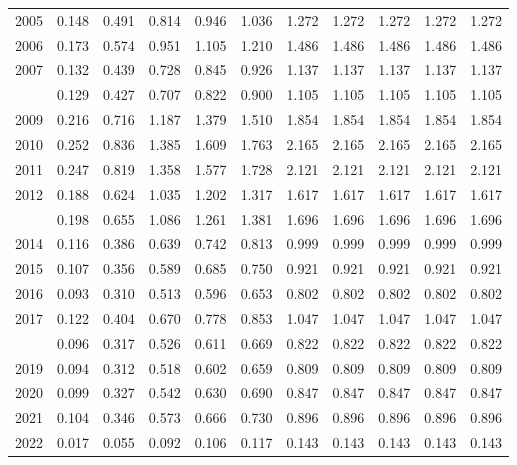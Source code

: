 \documentclass[
]{article}
\begin{document}
\begin{longtable}[t]{lrrrrrrrrrr}
2005 & 0.148 & 0.491 & 0.814 & 0.946 & 1.036 & 1.272 & 1.272 & 1.272 & 1.272 & 1.272\\
2006 & 0.173 & 0.574 & 0.951 & 1.105 & 1.210 & 1.486 & 1.486 & 1.486 & 1.486 & 1.486\\
2007 & 0.132 & 0.439 & 0.728 & 0.845 & 0.926 & 1.137 & 1.137 & 1.137 & 1.137 & 1.137\\
\addlinespace
2008 & 0.129 & 0.427 & 0.707 & 0.822 & 0.900 & 1.105 & 1.105 & 1.105 & 1.105 & 1.105\\
2009 & 0.216 & 0.716 & 1.187 & 1.379 & 1.510 & 1.854 & 1.854 & 1.854 & 1.854 & 1.854\\
2010 & 0.252 & 0.836 & 1.385 & 1.609 & 1.763 & 2.165 & 2.165 & 2.165 & 2.165 & 2.165\\
2011 & 0.247 & 0.819 & 1.358 & 1.577 & 1.728 & 2.121 & 2.121 & 2.121 & 2.121 & 2.121\\
2012 & 0.188 & 0.624 & 1.035 & 1.202 & 1.317 & 1.617 & 1.617 & 1.617 & 1.617 & 1.617\\
\addlinespace
2013 & 0.198 & 0.655 & 1.086 & 1.261 & 1.381 & 1.696 & 1.696 & 1.696 & 1.696 & 1.696\\
2014 & 0.116 & 0.386 & 0.639 & 0.742 & 0.813 & 0.999 & 0.999 & 0.999 & 0.999 & 0.999\\
2015 & 0.107 & 0.356 & 0.589 & 0.685 & 0.750 & 0.921 & 0.921 & 0.921 & 0.921 & 0.921\\
2016 & 0.093 & 0.310 & 0.513 & 0.596 & 0.653 & 0.802 & 0.802 & 0.802 & 0.802 & 0.802\\
2017 & 0.122 & 0.404 & 0.670 & 0.778 & 0.853 & 1.047 & 1.047 & 1.047 & 1.047 & 1.047\\
\addlinespace
2018 & 0.096 & 0.317 & 0.526 & 0.611 & 0.669 & 0.822 & 0.822 & 0.822 & 0.822 & 0.822\\
2019 & 0.094 & 0.312 & 0.518 & 0.602 & 0.659 & 0.809 & 0.809 & 0.809 & 0.809 & 0.809\\
2020 & 0.099 & 0.327 & 0.542 & 0.630 & 0.690 & 0.847 & 0.847 & 0.847 & 0.847 & 0.847\\
2021 & 0.104 & 0.346 & 0.573 & 0.666 & 0.730 & 0.896 & 0.896 & 0.896 & 0.896 & 0.896\\
2022 & 0.017 & 0.055 & 0.092 & 0.106 & 0.117 & 0.143 & 0.143 & 0.143 & 0.143 & 0.143\\*
\end{longtable}
\end{document}
